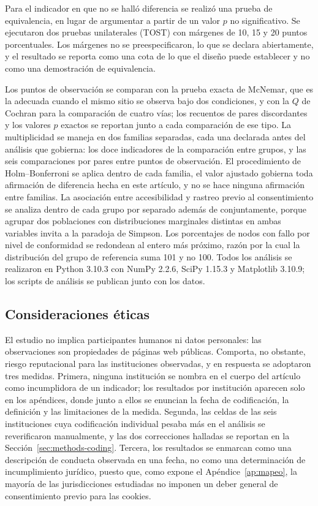 \documentclass[pdflatex,sn-basic,Numbered,iicol]{sn-jnl}
\theoremstyle{thmstyleone}
\theoremstyle{thmstyletwo}
\theoremstyle{thmstylethree}
\begin{document}
Para el indicador en que no se hall\'o diferencia se realiz\'o una prueba de equivalencia, en lugar de argumentar a partir de un valor $p$ no significativo. Se ejecutaron dos pruebas unilaterales (TOST) con m\'argenes de 10, 15 y 20 puntos porcentuales. Los m\'argenes no se preespecificaron, lo que se declara abiertamente, y el resultado se reporta como una cota de lo que el dise\~no puede establecer y no como una demostraci\'on de equivalencia.

Los puntos de observaci\'on se comparan con la prueba exacta de McNemar, que es la adecuada cuando el mismo sitio se observa bajo dos condiciones, y con la $Q$ de Cochran para la comparaci\'on de cuatro v\'ias; los recuentos de pares discordantes y los valores $p$ exactos se reportan junto a cada comparaci\'on de ese tipo. La multiplicidad se maneja en dos familias separadas, cada una declarada antes del an\'alisis que gobierna: los doce indicadores de la comparaci\'on entre grupos, y las seis comparaciones por pares entre puntos de observaci\'on. El procedimiento de Holm--Bonferroni se aplica dentro de cada familia, el valor ajustado gobierna toda afirmaci\'on de diferencia hecha en este art\'iculo, y no se hace ninguna afirmaci\'on entre familias. La asociaci\'on entre accesibilidad y rastreo previo al consentimiento se analiza dentro de cada grupo por separado adem\'as de conjuntamente, porque agrupar dos poblaciones con distribuciones marginales distintas en ambas variables invita a la paradoja de Simpson. Los porcentajes de nodos con fallo por nivel de conformidad se redondean al entero m\'as pr\'oximo, raz\'on por la cual la distribuci\'on del grupo de referencia suma 101 y no 100. Todos los an\'alisis se realizaron en Python 3.10.3 con NumPy 2.2.6, SciPy 1.15.3 y Matplotlib 3.10.9; los scripts de an\'alisis se publican junto con los datos.

\subsection{Consideraciones \'eticas}\label{sec:methods-ethics}

El estudio no implica participantes humanos ni datos personales: las observaciones son propiedades de p\'aginas web p\'ublicas. Comporta, no obstante, riesgo reputacional para las instituciones observadas, y en respuesta se adoptaron tres medidas. Primera, ninguna instituci\'on se nombra en el cuerpo del art\'iculo como incumplidora de un indicador; los resultados por instituci\'on aparecen solo en los ap\'endices, donde junto a ellos se enuncian la fecha de codificaci\'on, la definici\'on y las limitaciones de la medida. Segunda, las celdas de las seis instituciones cuya codificaci\'on individual pesaba m\'as en el an\'alisis se reverificaron manualmente, y las dos correcciones halladas se reportan en la Secci\'on~\ref{sec:methods-coding}. Tercera, los resultados se enmarcan como una descripci\'on de conducta observada en una fecha, no como una determinaci\'on de incumplimiento jur\'idico, puesto que, como expone el Ap\'endice~\ref{ap:mapeo}, la mayor\'ia de las jurisdicciones estudiadas no imponen un deber general de consentimiento previo para las cookies.
\end{document}

